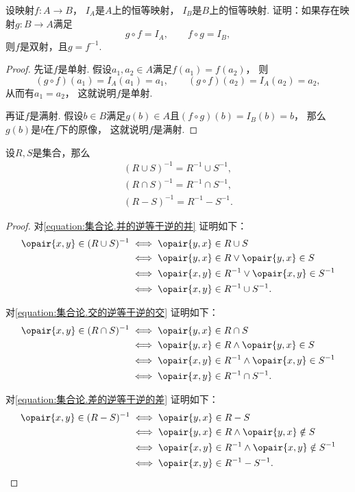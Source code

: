 \begin{example}\label{example:映射.可逆映射是双射}
设映射\(f\colon A \to B\)，
\(I_A\)是\(A\)上的恒等映射，
\(I_B\)是\(B\)上的恒等映射.
证明：如果存在映射\(g\colon B \to A\)满足\[
	g \circ f = I_A,
	\qquad
	f \circ g = I_B,
\]
则\(f\)是双射，且\(g = f^{-1}\).
\begin{proof}
先证\(f\)是单射.
假设\(a_1,a_2 \in A\)满足\(f(a_1) = f(a_2)\)，
则\[
	(g \circ f)(a_1)
	= I_A(a_1)
	= a_1,
	\qquad
	(g \circ f)(a_2)
	= I_A(a_2)
	= a_2,
\]
从而有\(a_1 = a_2\)，
这就说明\(f\)是单射.

再证\(f\)是满射.
假设\(b \in B\)满足\(g(b) \in A\)且\((f \circ g)(b) = I_B(b) = b\)，
那么\(g(b)\)是\(b\)在\(f\)下的原像，
这就说明\(f\)是满射.
\end{proof}
\end{example}

\begin{theorem}
设\(R,S\)是集合，那么\begin{gather}
	(R \cup S)^{-1} = R^{-1} \cup S^{-1},
	\label{equation:集合论.并的逆等于逆的并} \\
	(R \cap S)^{-1} = R^{-1} \cap S^{-1},
	\label{equation:集合论.交的逆等于逆的交} \\
	(R - S)^{-1} = R^{-1} - S^{-1}.
	\label{equation:集合论.差的逆等于逆的差}
\end{gather}
\begin{proof}
对\cref{equation:集合论.并的逆等于逆的并} 证明如下：
\begin{align*}
	\opair{x,y} \in (R \cup S)^{-1}
	&\iff \opair{y,x} \in R \cup S \\
	&\iff \opair{y,x} \in R \lor \opair{y,x} \in S \\
	&\iff \opair{x,y} \in R^{-1} \lor \opair{x,y} \in S^{-1} \\
	&\iff \opair{x,y} \in R^{-1} \cup S^{-1}.
\end{align*}

对\cref{equation:集合论.交的逆等于逆的交} 证明如下：
\begin{align*}
	\opair{x,y} \in (R \cap S)^{-1}
	&\iff \opair{y,x} \in R \cap S \\
	&\iff \opair{y,x} \in R \land \opair{y,x} \in S \\
	&\iff \opair{x,y} \in R^{-1} \land \opair{x,y} \in S^{-1} \\
	&\iff \opair{x,y} \in R^{-1} \cap S^{-1}.
\end{align*}

对\cref{equation:集合论.差的逆等于逆的差} 证明如下：
\begin{align*}
	\opair{x,y} \in (R - S)^{-1}
	&\iff \opair{y,x} \in R - S \\
	&\iff \opair{y,x} \in R \land \opair{y,x} \notin S \\
	&\iff \opair{x,y} \in R^{-1} \land \opair{x,y} \notin S^{-1} \\
	&\iff \opair{x,y} \in R^{-1} - S^{-1}.
	\qedhere
\end{align*}
\end{proof}
\end{theorem}

